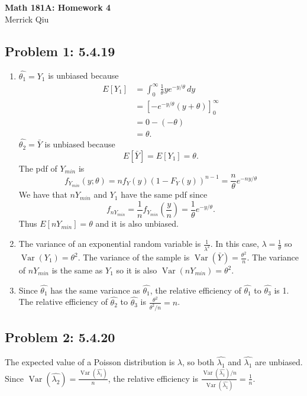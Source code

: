 \documentclass{article}
\newcommand{\var}{\operatorname{Var}}
\begin{document}
\begin{center}
	\huge{\bf Math 181A: Homework 4} \\
	Merrick Qiu 
\end{center}

\subsection*{Problem 1: 5.4.19}
\begin{enumerate}
	\item $\hat{\theta_1} = Y_1$ is unbiased because 
		\begin{align*}
			E[Y_1] 
			&= \int_0^\infty \frac{1}{\theta}ye^{-y/\theta} \,dy \\
			&= \left[-e^{-y/\theta}(y+\theta)\right]_0^\infty \\
			&= 0 - (-\theta) \\
			&= \theta.
		\end{align*}
		$\hat{\theta_2} = \bar{Y}$ is unbiased because 
		\[
			E[\bar{Y}] = E[Y_1] = \theta.
		\]
		The pdf of $Y_{min}$ is 
		\[
			f_{Y_{min}}(y;\theta) 
			= nf_Y(y)(1-F_Y(y))^{n-1}
			= \frac{n}{\theta}e^{-ny/\theta}
		\]
		We have that $nY_{min}$ and $Y_1$ have the same pdf since
		\[
			f_{nY_{min}}
			=\frac{1}{n}f_{Y_{min}}(\frac{y}{n})
			=\frac{1}{\theta}e^{-y/\theta}.
		\]
		Thus $E[nY_{min}] = \theta$ and it is also unbiased.
	\item The variance of an exponential random variable is $\frac{1}{\lambda^2}$.
	In this case, $\lambda = \frac{1}{\theta}$ so $\var(Y_1) = \theta^2$.
	The variance of the sample is $\var(\bar{Y}) = \frac{\theta^2}{n}$.
	The variance of $nY_{min}$ is the same as $Y_1$ so it is also 
	$\var(nY_{min}) = \theta^2$.
	\item Since $\hat{\theta_1}$ has the same variance as $\hat{\theta_1}$,
	the relative efficiency of $\hat{\theta_1}$ to $\hat{\theta_3}$ is 1.
	The relative efficiency of  $\hat{\theta_2}$ to $\hat{\theta_3}$ is 
	$\frac{\theta^2}{\theta^2/n} = n$.
\end{enumerate}
\newpage

\subsection*{Problem 2: 5.4.20}
The expected value of a Poisson distribution is $\lambda$,
so both $\hat{\lambda_1}$ and $\hat{\lambda_1}$ are unbiased.
 Since $\var(\hat{\lambda_2}) = \frac{\var(\hat{\lambda_1})}{n}$,
 the relative efficiency is 
 $\frac{\var(\hat{\lambda_1})/n}{\var(\hat{\lambda_1})} = \frac{1}{n}$.
\newpage
\end{document}
